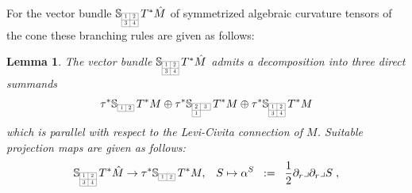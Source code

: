 \documentclass[11pt,a4paper]{article}
\theoremstyle{plain}
\newtheorem{lemma}{Lemma}
\theoremstyle{remark}
\newcommand{\bbS}{\mathbb{S}}
\def\pd{\partial}
\begin{document}
For the vector bundle $\bbS_{\scaleto{\begin{array}{|c|c|}
\cline{1-2}
1 & 2 \\
\cline{1-2}
3 & 4 \\
\cline{1-2}
\end{array}}{12pt}}\, T^*\hat M$ of symmetrized algebraic curvature tensors of the cone these
branching rules are given as follows: 

\bigskip
\begin{lemma}\label{le:branching_rules}
The vector bundle $\bbS_{\scaleto{\begin{array}{|c|c|}
\cline{1-2}
1 & 2 \\
\cline{1-2}
3 & 4 \\
\cline{1-2}
\end{array}}{12pt}}\, T^*\hat M$ admits a decomposition into three direct summands
\begin{equation}\label{eq:glndec}
\tau^*\bbS_{\scaleto{\begin{array}{|c|c|}
\cline{1-2}
1 & 2 \\
\cline{1-2}
\end{array}}{6pt}}\,T^*M\oplus \tau^*\bbS_{\scaleto{\begin{array}{|c|c|}
\cline{1-2}
2 & 3 \\
\cline{1-2}
1 & \multicolumn{1}{c}{\;\;\;} \\
\cline{1-1}
\end{array}}{12pt}}\,T^*M \oplus \tau^*\bbS_{\scaleto{\begin{array}{|c|c|}
\cline{1-2}
1 & 2 \\
\cline{1-2}
3 & 4 \\
\cline{1-2}
\end{array}}{12pt}}\, T^*M
\end{equation}
which is parallel with respect to the Levi-Civita connection of $M$. Suitable projection maps are given as follows:
\begin{eqnarray}
\label{eq:projection_1}
\bbS_{\scaleto{\begin{array}{|c|c|}
\cline{1-2}
1 & 2 \\
\cline{1-2}
3 & 4 \\
\cline{1-2}
\end{array}}{12pt}}\, T^*\hat M\to \tau^*\bbS_{\scaleto{\begin{array}{|c|c|}
\cline{1-2}
1 & 2 \\
\cline{1-2}
\end{array}}{6pt}}\,T^*M, & & S \mapsto \alpha^S \;\;:= \;\; \frac{1}{2}\pd_r\lrcorner \pd_r \lrcorner S\;,\\

\end{eqnarray}
\end{lemma}
\end{document}
